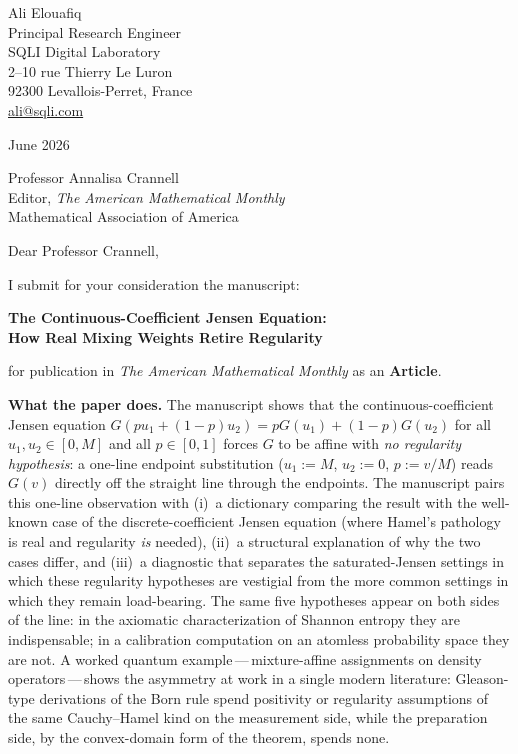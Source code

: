 \documentclass[12pt]{article}
\begin{document}
\noindent
Ali Elouafiq\\
Principal Research Engineer\\
SQLI Digital Laboratory\\
2--10 rue Thierry Le Luron\\
92300 Levallois-Perret, France\\
\href{mailto:ali@sqli.com}{ali@sqli.com}

\bigskip
{} June 2026

\bigskip
\noindent
Professor Annalisa Crannell\\
Editor, \textit{The American Mathematical Monthly}\\
Mathematical Association of America

\bigskip
\noindent
Dear Professor Crannell,

\medskip
\noindent
I submit for your consideration the manuscript:

\begin{center}
  \textbf{The Continuous-Coefficient Jensen Equation:}\\
  \textbf{How Real Mixing Weights Retire Regularity}
\end{center}

\noindent
for publication in \textit{The American Mathematical Monthly} as an
\textbf{Article}.

\bigskip
\noindent\textbf{What the paper does.}
The manuscript shows that the continuous-coefficient Jensen equation
$G(pu_1+(1-p)u_2)=pG(u_1)+(1-p)G(u_2)$ for all $u_1,u_2\in[0,M]$ and
all $p\in[0,1]$ forces $G$ to be affine with \emph{no regularity
hypothesis}: a one-line endpoint substitution ($u_1{:=}M$, $u_2{:=}0$,
$p{:=}v/M$) reads $G(v)$ directly off the straight line through the
endpoints. The manuscript pairs this one-line observation with
(i)~a dictionary comparing the result with the well-known case of the
discrete-coefficient Jensen equation (where Hamel's pathology is real
and regularity \emph{is} needed), (ii)~a structural explanation of
why the two cases differ, and (iii)~a diagnostic that separates the
saturated-Jensen settings in which these regularity hypotheses are
vestigial from the more common settings in which they remain
load-bearing. The same five hypotheses appear on both sides of the
line: in the axiomatic characterization of Shannon entropy they are
indispensable; in a calibration computation on an atomless
probability space they are not. A worked quantum
example\,---\,mixture-affine assignments on density
operators\,---\,shows the asymmetry at work in a single modern literature: Gleason-type derivations of the Born rule spend positivity or regularity assumptions of the same Cauchy--Hamel kind on the measurement side, while the
preparation side, by the convex-domain form of the theorem, spends
none.
\end{document}
